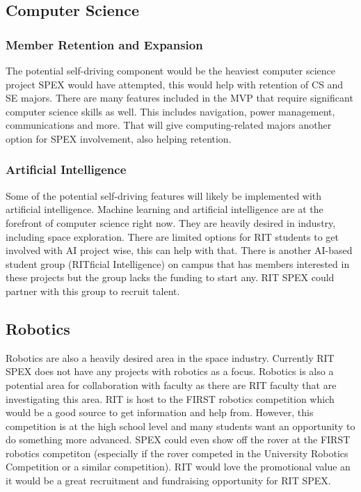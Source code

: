 \documentclass[conference]{IEEEtran} %
\begin{document}
\subsection{Computer Science}
\label{subsec:cs}
\subsubsection{Member Retention and Expansion}
\label{subsubsec:cs}
The potential self-driving component would be the heaviest computer science project SPEX would have attempted, this would help with retention of CS and SE majors. 
There are many features included in the MVP that require significant computer science skills as well.
This includes navigation, power management, communications and more.
That will give computing-related majors another option for SPEX involvement, also helping retention.

\subsubsection{Artificial Intelligence}
\label{subsubsec:ai}
Some of the potential self-driving features will likely be implemented with artificial intelligence.
Machine learning and artificial intelligence are at the forefront of computer science right now. 
They are heavily desired in industry, including space exploration.
There are limited options for RIT students to get involved with AI project wise, this can help with that. 
There is another AI-based student group (RITficial Intelligence) on campus that has members interested in these projects but the group lacks the funding to start any.
RIT SPEX could partner with this group to recruit talent.

\subsection{Robotics}
\label{subsec:robotics}
Robotics are also a heavily desired area in the space industry. 
Currently RIT SPEX does not have any projects with robotics as a focus. 
Robotics is also a potential area for collaboration with faculty as there are RIT faculty that are investigating this area.
RIT is host to the FIRST robotics competition which would be a good source to get information and help from. 
However, this competition is at the high school level and many students want an opportunity to do something more advanced. 
SPEX could even show off the rover at the FIRST robotics competiton (especially if the rover competed in the University Robotics Competition or a similar competition). 
RIT would love the promotional value an it would be a great recruitment and fundraising opportunity for RIT SPEX.
\end{document}
